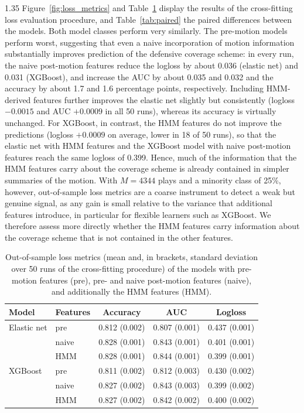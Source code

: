\documentclass[12pt,a4paper]{article}
\begin{document}
\begin{spacing}{1.35}
Figure~\ref{fig:loss_metrics} and Table~\ref{tab:perf} display the results of the cross-fitting loss evaluation procedure, and Table~\ref{tab:paired} the paired differences between the models. Both model classes perform very similarly. The pre-motion models perform worst, suggesting that even a naive incorporation of motion information substantially improves prediction of the defensive coverage scheme: in every run, the naive post-motion features reduce the logloss by about 0.036 (elastic net) and 0.031 (XGBoost), and increase the AUC by about 0.035 and 0.032 and the accuracy by about 1.7 and 1.6 percentage points, respectively. Including HMM-derived features further improves the elastic net slightly but consistently (logloss $-0.0015$ and AUC $+0.0009$ in all 50 runs), whereas its accuracy is virtually unchanged. For XGBoost, in contrast, the HMM features do not improve the predictions (logloss $+0.0009$ on average, lower in 18 of 50 runs), so that the elastic net with HMM features and the XGBoost model with naive post-motion features reach the same logloss of 0.399. Hence, much of the information that the HMM features carry about the coverage scheme is already contained in simpler summaries of the motion. With $M = 4344$ plays and a minority class of 25\%, however, out-of-sample loss metrics are a coarse instrument to detect a weak but genuine signal, as any gain is small relative to the variance that additional features introduce, in particular for flexible learners such as XGBoost. We therefore assess more directly whether the HMM features carry information about the coverage scheme that is not contained in the other features.

\begin{table}[t!]
\centering
\caption{Out-of-sample loss metrics (mean and, in brackets, standard deviation over 50 runs of the cross-fitting procedure) of the models with pre-motion features (pre), pre- and naive post-motion features (naive), and additionally the HMM features (HMM).}
\label{tab:perf}
\begin{tabular}{llccc}
\hline
Model & Features & Accuracy & AUC & Logloss \\
\hline
Elastic net & pre & 0.812 (0.002) & 0.807 (0.001) & 0.437 (0.001) \\
 & naive & 0.828 (0.001) & 0.843 (0.001) & 0.401 (0.001) \\
 & HMM & 0.828 (0.001) & 0.844 (0.001) & 0.399 (0.001) \\
XGBoost & pre & 0.811 (0.002) & 0.812 (0.003) & 0.430 (0.002) \\
 & naive & 0.827 (0.002) & 0.843 (0.003) & 0.399 (0.002) \\
 & HMM & 0.827 (0.002) & 0.842 (0.002) & 0.400 (0.002) \\
\hline
\end{tabular}
\end{table}


\end{spacing}
\end{document}
